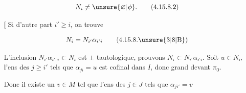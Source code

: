 \begingroup\makeatletter\tagsleft@true\makeatother
\[N_i\ne\unsure{\varnothing|\phi}.\tag*{(4.15.8.2)}\]
\endgroup

[ Si d'autre part $i'\geq i$, on trouve

\begingroup\makeatletter\tagsleft@true\makeatother
\[N_i=N_{i'}\alpha_{i'i}\tag*{(4.15.8.\unsure{3|8|B})}\]
\endgroup

L'inclusion $N_{i'}\alpha_{i',i}\subset N_i$ est $\pm$ tautologique,  prouvons $N_i\subset N_{i'}\alpha_{i'i}$. Soit $u\in N_i$, l'ens  des $j\geq i'$ tels que $\alpha_{ji}=u$ est cofinal dans $I$, donc grand devant $\pi_0$.


 Donc il existe un $v\in M$ tel que l'ens  des $j\in J$ tels que $\alpha_{ji'}=v$
